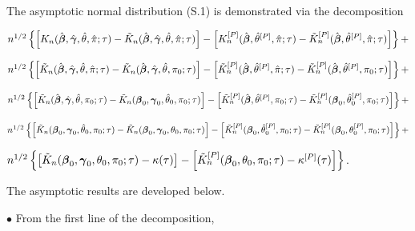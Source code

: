 \documentclass[12pt]{article}
\newcommand{\bg}{\mbox{\boldmath $\gamma$}}
\newcommand{\bb}{\mbox{\boldmath $\beta$}}
\begin{document}
\noindent The asymptotic normal distribution (S.1) is demonstrated via the decomposition 

\small
\noindent $ n^{1/2} \left\{ \left[K_n(\hat{\bb},\hat{\bg}, \hat{\theta},\hat{\pi};\tau) - \tilde{K}_n(\hat{\bb},\hat{\bg}, \hat{\theta},\hat{\pi};\tau) \right] - 
\left[ K_n^{[P]}(\hat{\bb},\hat{\theta}^{[P]},\hat{\pi};\tau) - \tilde{K}_n^{[P]}(\hat{\bb},\hat{\theta}^{[P]},\hat{\pi};\tau) \right] \right\} + $

\noindent $n^{1/2} \left\{ \left[\tilde{K}_n(\hat{\bb},\hat{\bg}, \hat{\theta},\hat{\pi};\tau) - \tilde{K}_n(\hat{\bb},\hat{\bg}, \hat{\theta},\pi_0;\tau) \right] -
\left[\tilde{K}_n^{[P]}(\hat{\bb},\hat{\theta}^{[P]},\hat{\pi};\tau) - \tilde{K}_n^{[P]}(\hat{\bb},\hat{\theta}^{[P]},\pi_0;\tau) \right] \right\} + $

\noindent $n^{1/2} \left\{ \left[\tilde{K}_n(\hat{\bb},\hat{\bg}, \hat{\theta},\pi_0;\tau) - \tilde{K}_n(\bb_0,\bg_0, \hat{\theta}_0,\pi_0;\tau) \right] -
\left[\tilde{K}_n^{[P]}(\hat{\bb},\hat{\theta}^{[P]},\pi_0;\tau) - \tilde{K}_n^{[P]}(\bb_0, \hat{\theta}_0^{[P]},\pi_0;\tau) \right] \right\} + $

\noindent $ n^{1/2} \left\{ \left[\tilde{K}_n(\bb_0,\bg_0, \hat{\theta}_0,\pi_0;\tau) - \tilde{K}_n(\bb_0,\bg_0, \theta_0,\pi_0;\tau) \right] - 
\left[\tilde{K}_n^{[P]}(\bb_0,\hat{\theta}_0^{[P]},\pi_0;\tau) - \tilde{K}_n^{[P]}(\bb_0, \theta_0^{[P]},\pi_0;\tau) \right] \right\} + $

\noindent $n^{1/2} \left\{ \left[\tilde{K}_n(\bb_0,\bg_0, \theta_0,\pi_0;\tau) - \kappa(\tau) \right] - 
\left[ \tilde{K}_n^{[P]}(\bb_0,\theta_0,\pi_0;\tau) - \kappa^{[P]}( \tau) \right] \right\} $.

\normalsize



\noindent The asymptotic results are developed below.  

\vskip 0.25in

\noindent $\bullet$  From the first line of the decomposition, 
\end{document}
